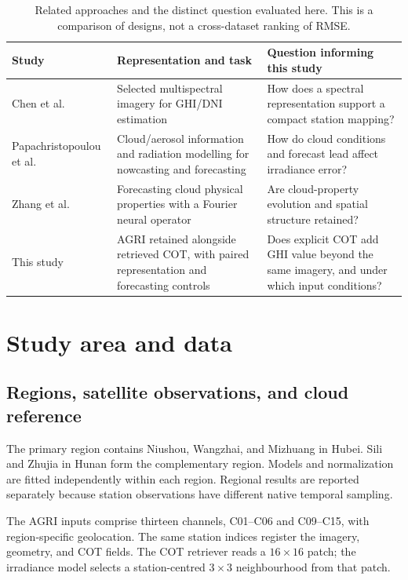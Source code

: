 \documentclass[11pt]{article}
\begin{document}
\begin{table}[!htbp]\centering\small
\caption{Related approaches and the distinct question evaluated here. This is a comparison of designs, not a cross-dataset ranking of RMSE.}\label{tab:related}
\begin{tabularx}{\linewidth}{p{29mm}XX}\toprule
Study & Representation and task & Question informing this study\\\midrule
Chen et al.\ \cite{chen2023} & Selected multispectral imagery for GHI/DNI estimation & How does a spectral representation support a compact station mapping?\\
Papachristopoulou et al.\ \cite{pap2024} & Cloud/aerosol information and radiation modelling for nowcasting and forecasting & How do cloud conditions and forecast lead affect irradiance error?\\
Zhang et al.\ \cite{zhang2026} & Forecasting cloud physical properties with a Fourier neural operator & Are cloud-property evolution and spatial structure retained?\\
This study & AGRI retained alongside retrieved COT, with paired representation and forecasting controls & Does explicit COT add GHI value beyond the same imagery, and under which input conditions?\\\bottomrule
\end{tabularx}\end{table}

\section{Study area and data}
\subsection{Regions, satellite observations, and cloud reference}
The primary region contains Niushou, Wangzhai, and Mizhuang in Hubei. Sili and Zhujia in Hunan form the complementary region. Models and normalization are fitted independently within each region. Regional results are reported separately because station observations have different native temporal sampling.

The AGRI inputs comprise thirteen channels, C01--C06 and C09--C15, with region-specific geolocation. The same station indices register the imagery, geometry, and COT fields. The COT retriever reads a $16\times16$ patch; the irradiance model selects a station-centred $3\times3$ neighbourhood from that patch. 
\end{document}

